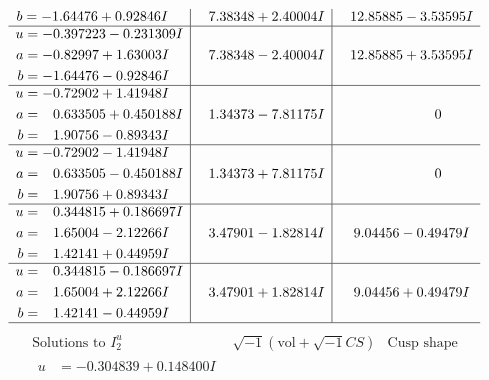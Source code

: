 \documentclass[1p]{elsarticle_modified}
\theoremstyle{definition}
\newcommand{\I}{\sqrt{-1}}
\begin{document}
$$\begin{array}{c|c|c}
\begin{aligned}
b &= -1.64476 + 0.92846 I\end{aligned}
 & \phantom{-}7.38348 + 2.40004 I & \phantom{-}12.85885 - 3.53595 I \\ \hline\begin{aligned}
u &= -0.397223 - 0.231309 I \\
a &= -0.82997 + 1.63003 I \\
b &= -1.64476 - 0.92846 I\end{aligned}
 & \phantom{-}7.38348 - 2.40004 I & \phantom{-}12.85885 + 3.53595 I \\ \hline\begin{aligned}
u &= -0.72902 + 1.41948 I \\
a &= \phantom{-}0.633505 + 0.450188 I \\
b &= \phantom{-}1.90756 - 0.89343 I\end{aligned}
 & \phantom{-}1.34373 - 7.81175 I & \phantom{-0.000000 } 0 \\ \hline\begin{aligned}
u &= -0.72902 - 1.41948 I \\
a &= \phantom{-}0.633505 - 0.450188 I \\
b &= \phantom{-}1.90756 + 0.89343 I\end{aligned}
 & \phantom{-}1.34373 + 7.81175 I & \phantom{-0.000000 } 0 \\ \hline\begin{aligned}
u &= \phantom{-}0.344815 + 0.186697 I \\
a &= \phantom{-}1.65004 - 2.12266 I \\
b &= \phantom{-}1.42141 + 0.44959 I\end{aligned}
 & \phantom{-}3.47901 - 1.82814 I & \phantom{-}9.04456 - 0.49479 I \\ \hline\begin{aligned}
u &= \phantom{-}0.344815 - 0.186697 I \\
a &= \phantom{-}1.65004 + 2.12266 I \\
b &= \phantom{-}1.42141 - 0.44959 I\end{aligned}
 & \phantom{-}3.47901 + 1.82814 I & \phantom{-}9.04456 + 0.49479 I\\
 \hline 
 \end{array}$$\newpage$$\begin{array}{c|c|c}  
\text{Solutions to }I^u_{2}& \I (\text{vol} + \sqrt{-1}CS) & \text{Cusp shape}\\
 \hline 
\begin{aligned}
u &= -0.304839 + 0.148400 I \\

\end{aligned}
\end{array}$$
\end{document}
